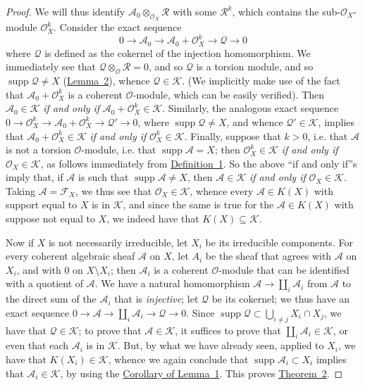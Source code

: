 \documentclass{article}
\newcommand{\scr}[1]{{\mathscr{#1}}}
\renewcommand{\cal}[1]{{\mathcal{#1}}}
\newcommand{\supp}{\operatorname{supp}}
\newcommand{\oldpage}[1]{\marginpar{\footnotesize$\Big\vert$ \textit{p.~#1}}}
\begin{document}
\begin{proof}
  We will thus identify $\scr{A}_0\otimes_{\scr{O}_X}\scr{R}$ with some $\scr{R}^k$, which contains the sub-$\scr{O}_X$-module $\scr{O}_X^k$.
  Consider the exact sequence
  \[
    0 \to \scr{A}_0 \to \scr{A}_0+\scr{O}_X^k \to \scr{Q} \to 0
  \]
  where $\scr{Q}$ is defined as the cokernel of the injection homomorphism.
  We immediately see that $\scr{Q}\otimes_{\scr{O}}\scr{R}=0$, and so $\scr{Q}$ is a torsion module, and so $\supp\scr{Q}\neq X$ (\hyperref[lemma2]{Lemma~2}), whence $\scr{Q}\in\cal{K}$.
  (We implicitly make use of the fact that $\scr{A}_0+\scr{O}_X^k$ is a coherent $\scr{O}$-module, which can be easily verified).
  Then $\scr{A}_0\in\cal{K}$ \emph{if and only if} $\scr{A}_0+\scr{O}_X^k\in\cal{K}$.
  Similarly, the analogous exact sequence
  \oldpage{2-04}
  $0\to\scr{O}_X^k\to\scr{A}_0+\scr{O}_X^k\to\scr{Q}'\to0$, where $\supp\scr{Q}\neq X$, and whence $\scr{Q}'\in\cal{K}$, implies that $\scr{A}_0+\scr{O}_X^k\in\cal{K}$ \emph{if and only if} $\scr{O}_X^k\in\cal{K}$.
  Finally, suppose that $k>0$, i.e. that $\scr{A}$ is not a torsion $\scr{O}$-module, i.e. that $\supp\scr{A}=X$;
  then $\scr{O}_X^k\in\cal{K}$ \emph{if and only if} $\scr{O}_X\in\cal{K}$, as follows immediately from \hyperref[definition1]{Definition~1}.
  So the above ``if and only if''s imply that, if $\scr{A}$ is such that $\supp\scr{A}\neq X$, then $\scr{A}\in\cal{K}$ \emph{if and only if} $\scr{O}_X\in\cal{K}$.
  Taking $\scr{A}=\scr{F}_X$, we thus see that $\scr{O}_X\in\cal{K}$, whence every $\scr{A}\in K(X)$ with support equal to $X$ is in $\cal{K}$, and since the same is true for the $\scr{A}\in K(X)$ with suppose not equal to $X$, we indeed have that $K(X)\subseteq\cal{K}$.

  Now if $X$ is not necessarily irreducible, let $X_i$ be its irreducible components.
  For every coherent algebraic sheaf $\scr{A}$ on $X$, let $A_i$ be the sheaf that agrees with $\scr{A}$ on $X_i$, and with $0$ on $X\setminus X_i$;
  then $\scr{A}_i$ is a coherent $\scr{O}$-module that can be identified with a quotient of $\scr{A}$.
  We have a natural homomorphism $\scr{A}\to\coprod_i\scr{A}_i$ from $\scr{A}$ to the direct sum of the $\scr{A}_i$ that is \emph{injective};
  let $\scr{Q}$ be its cokernel;
  we thus have an exact sequence $0\to\scr{A}\to\coprod_i\scr{A}_i\to\scr{Q}\to0$.
  Since $\supp\scr{Q}\subset\bigcup_{i\neq j}X_i\cap X_j$, we have that $\scr{Q}\in\cal{K}$;
  to prove that $\scr{A}\in\cal{K}$, it suffices to prove that $\coprod_i\scr{A}_i\in\cal{K}$, or even that each $\scr{A}_i$ is in $\cal{K}$.
  But, by what we have already seen, applied to $X_i$, we have that $K(X_i)\in\cal{K}$, whence we again conclude that $\supp\scr{A}_i\subset X_i$ implies that $\scr{A}_i\in\cal{K}$, by using the \hyperref[corollary-1]{Corollary of Lemma~1}.
  This proves \hyperref[theorem2]{Theorem~2}.
\end{proof}
\end{document}
